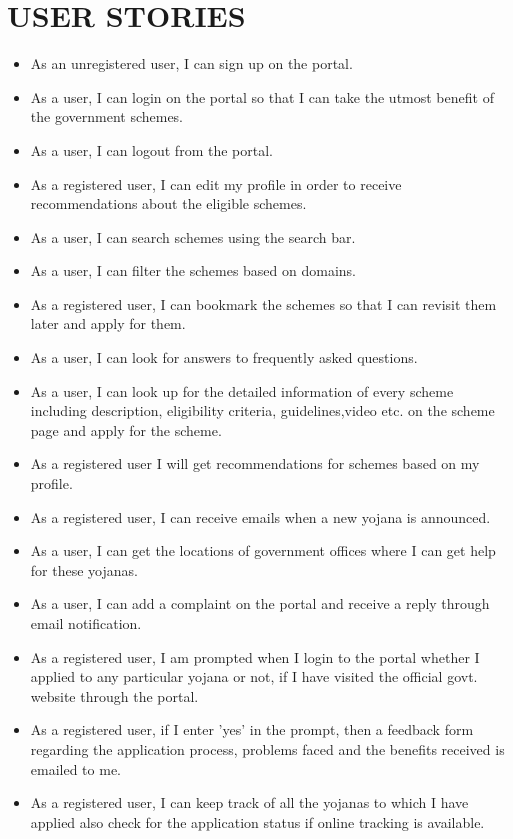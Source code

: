 \documentclass[conference]{IEEEtran}
\begin{document}
\section{USER STORIES}
\begin{itemize}
    \item As an unregistered user, I can sign up on the portal.
    \item As a user, I can login on the portal so that I can take the utmost benefit of the government schemes.
    \item As a user, I can logout from the portal.
    \item As a registered user, I can edit my profile in order to receive recommendations about the eligible schemes.
    \item As a user, I can search schemes using the search bar.
    \item As a user, I can filter the schemes based on domains.
    \item As a registered user, I can bookmark the schemes so that I can revisit them later and apply for them.
    \item As a user, I can look for answers to frequently asked questions.
    \item As a user, I can look up for the detailed information of every scheme including description, eligibility criteria, guidelines,video etc. on the scheme page and apply for the scheme.
    \item As a registered user I will get recommendations for schemes based on my profile.
    \item As a registered user, I can receive emails when a new yojana is announced.
    \item As a user, I can get the locations of government offices where I can get help for these yojanas.
    \item As a user, I can add a complaint on the portal and receive a reply through email notification.
    \item As a registered user, I am prompted when I login to the portal whether I applied to any particular yojana or not, if I have visited the official govt. website through the portal.
    \item As a registered user, if I enter 'yes' in the prompt, then a feedback form regarding the application process, problems faced and the benefits received is emailed to me.
    \item As a registered user, I can keep track of all the yojanas to which I have applied also check for the application status if online tracking is available.

\end{itemize}
\end{document}
